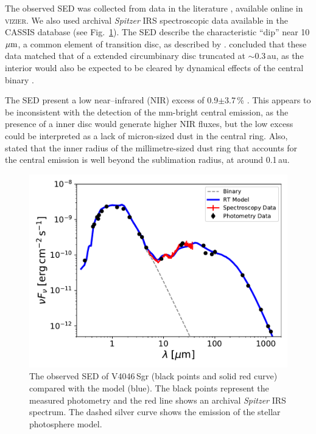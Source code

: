 \documentclass[fleqn,usenatbib,useAMS]{mnras}
\begin{document}
The observed SED was collected from data in the literature \citep{1988iras....7.....H, 1990A&A...234..230H, Jensen_97, 2000A&A...355L..27H, 2001KFNT...17..409K, 2003yCat.2246....0C, 2007PASJ...59S.369M, 2008PASP..120.1128O, 2010A&A...514A...1I, 2012yCat.2311....0C}, available online in \textsc{vizier}. We also used archival \textit{Spitzer} IRS spectroscopic data available in the CASSIS database \citep{Lebouteiller_2015} (see Fig.~\ref{fig:SED}). The SED describe the characteristic “dip” near 10 $\hbox{$\mu$m}$, a common element of transition disc, as described by \citet{Rosenfeld_2013}. \citet{Jensen_97} concluded that these data matched that of a extended circumbinary disc truncated at $\sim$0.3\,au, as the interior would also be expected to be cleared by dynamical effects of the central binary \citep{Art_Lu}. 

The SED present a low near--infrared (NIR) excess of 0.9$\pm$3.7\,\% \citep{Francis_2020}. This appears to be inconsistent with the detection of the mm-bright central emission, as the presence of a inner disc would generate higher NIR fluxes, but the low excess could be interpreted as a lack of micron-sized dust in the central ring. Also, \citet{Francis_2020} stated that the inner radius of the millimetre-sized dust ring that accounts for the central emission is well beyond the sublimation radius, at around 0.1\,au.

\begin{figure}
	\centering
	\includegraphics[width=\columnwidth]{SED_.pdf}
    \caption{The observed SED of V4046\,Sgr (black points and solid red curve) compared with the model (blue). The black points represent the measured photometry and the red line shows an archival \textit{Spitzer} IRS spectrum. The dashed silver curve shows the emission of the stellar photosphere model.}
    \label{fig:SED}
\end{figure}
\end{document}

